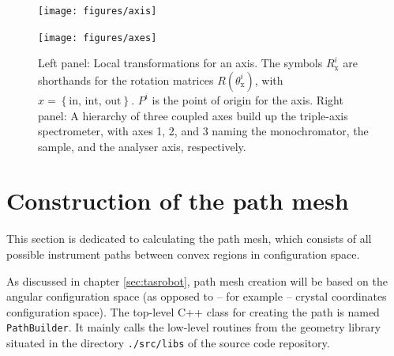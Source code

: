 \begin{figure}
	\begin{minipage}{0.45 \textwidth}
		\begin{center}
			\texttt{[image: figures/axis]}
		\end{center}
	\end{minipage}
	\begin{minipage}{0.45 \textwidth}
		\begin{center}
			\texttt{[image: figures/axes]}
		\end{center}
	\end{minipage}
	\caption[Instrument axis coordinate systems.]{
	Left panel: Local transformations for an axis. The symbols $R_{\mathrm{x}}^i$ are shorthands
	for the rotation matrices $R\left( \theta_{\mathrm{x}}^i \right)$, with $x = \left\{ \mathrm{in,\, int,\, out} \right\}$.
	$P^i$ is the point of origin for the axis.
	Right panel: A hierarchy of three coupled axes build up the triple-axis spectrometer, with axes 1, 2, and 3 
	naming the monochromator, the sample, and the analyser axis, respectively.
	\label{fig:tas_axes}}
\end{figure}






\section{Construction of the path mesh}
\label{sec:buildpath}
This section is dedicated to calculating the path mesh, which consists of all possible instrument paths between
convex regions in configuration space.

As discussed in chapter \ref{sec:tasrobot}, path mesh creation will be based on the angular configuration space
(as opposed to -- for example -- crystal coordinates configuration space). 
The top-level C++ class for creating the path is named \lstinline[language=C++]|PathBuilder|. 
It mainly calls the low-level routines from the geometry library situated in the directory \lstinline|./src/libs| 
of the source code repository.


